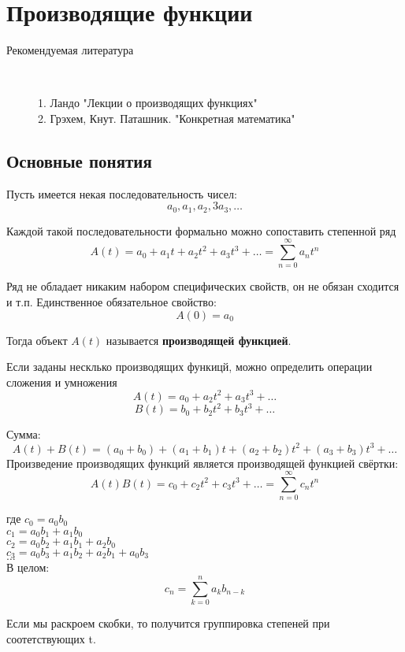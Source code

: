\section{Производящие функции}

\begin{description}
\item[Рекомендуемая литература]~ 

1. Ландо "Лекции о производящих функциях" \\
2. Грэхем, Кнут. Паташник. "Конкретная математика" \\
\end{description}

\subsection{Основные понятия}

Пусть имеется некая последовательность чисел:
$$
a_0, a_1, a_2, 3 a_3, \ldots
$$

Каждой такой последовательности формально можно сопоставить степенной ряд
$$
A(t) = a_0 + a_1 t + a_2 t^2 + a_3 t^3 + \ldots = \sum\limits_{n=0}^{\infty} a_{n} t^{n}
$$

Ряд не обладает никаким набором специфических свойств, он не обязан сходится и т.п.
Единственное обязательное свойство:
$$
A(0) = a_{0}
$$

Тогда объект $ A(t) $ называется \textbf{производящей функцией}.

Если заданы несклько производящих функицй, можно определить операции сложения и умножения
$$
A(t) = a_0 + a_2 t^2 + a_3 t^3 + \ldots
$$
$$
B(t) = b_0 + b_2 t^2 + b_3 t^3 + \ldots
$$

Сумма:
$$
A(t) + B(t) = (a_0+b_0) + (a_1+b_1) t + (a_2+b_2) t^2 + (a_3+b_3) t^3 + \ldots
$$
Произведение производящих функций является производящей функцией свёртки:
$$
A(t) B(t) = c_0 + c_2 t^2 + c_3 t^3 + \ldots = \sum_{n=0}^\infty c_n t^n
$$

где
$c_0 = a_0 b_0$	\\
$c_1 = a_0 b_1 + a_1 b_0 $ \\
$c_2 = a_0 b_2 + a_1 b_1 + a_2 b_0  $\\
$c_3 = a_0 b_3 + a_1 b_2 + a_2 b_1 + a_0 b_3$\\
$\ldots$\\

В целом:
$$
c_n = \sum_{k=0}^n a_k b_{n-k}
$$

Если мы раскроем скобки, то получится группировка степеней при соотетствующих t.

